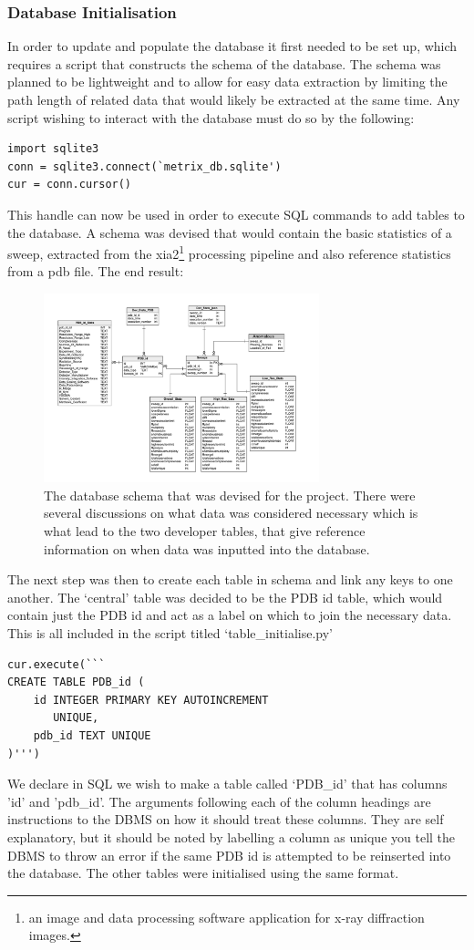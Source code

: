 \documentclass[11pt, a4paper]{article}
\begin{document}
\begin{multicols}{2}
\subsubsection{Database Initialisation}
In order to update and populate the database it first needed to be set up, which requires a script that constructs the schema of the database. The schema was planned to be lightweight and to allow for easy data extraction by limiting the path length of related data that would likely be extracted at the same time. Any script wishing to interact with the database must do so by the following:
\begin{verbatim}
import sqlite3
conn = sqlite3.connect(`metrix_db.sqlite')
cur = conn.cursor()
\end{verbatim}
This handle can now be used in order to execute SQL commands to add tables to the database. A schema was devised that would contain the basic statistics of a sweep, extracted from the xia2\footnote{an image and data processing software application for x-ray diffraction images.} processing pipeline and also reference statistics from a pdb file. The end result:
\begin{figure}[H]
\includegraphics[width=8cm]{metrix_database}
\centering
\caption{\footnotesize The database schema that was devised for the project. There were several discussions on what data was considered necessary which is what lead to the two developer tables, that give reference information on when data was inputted into the database.}
\end{figure}
 The next step was then to create each table in schema and link any keys to one another. The `central' table was decided to be the PDB id table, which would contain just the PDB id and act as a label on which to join the necessary data. This is all included in the script titled `table\_initialise.py'
\begin{verbatim}
cur.execute(```
CREATE TABLE PDB_id (
    id INTEGER PRIMARY KEY AUTOINCREMENT 
       UNIQUE,
    pdb_id TEXT UNIQUE
)''')
\end{verbatim}
We declare in SQL we wish to make a table called `PDB\_id' that has columns 'id' and 'pdb\_id'. The arguments following each of the column headings are instructions to the DBMS on how it should treat these columns. They are self explanatory, but it should be noted by labelling a column as unique you tell the DBMS to throw an error if the same PDB id is attempted to be reinserted into the database. The other tables were initialised using the same format. 

\end{multicols}
\end{document}
